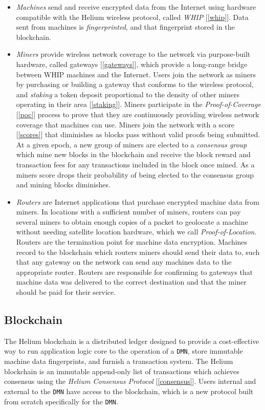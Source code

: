 \documentclass[10pt, nonatbib, nocopyrightspace, reprint]{sigplanconf}
\newcommand{\secref}[1]{[\autoref{#1}]}
\begin{document}
\begin{itemize}
    \item \emph{Machines} send and receive encrypted data from the Internet using hardware compatible with the Helium wireless protocol, called \emph{WHIP} \secref{whip}. Data sent from machines is \emph{fingerprinted}, and that fingerprint stored in the blockchain.
    \item \emph{Miners} provide wireless network coverage to the network via purpose-built hardware, called gateways \secref{gateways}, which provide a long-range bridge between WHIP machines and the Internet. Users join the network as miners by purchasing or building a gateway that conforms to the wireless protocol, and \emph{staking} a token deposit proportional to the density of other miners operating in their area \secref{staking}. Miners participate in the \emph{Proof-of-Coverage} \secref{poc} process to prove that they are continuously providing wireless network coverage that machines can use. Miners join the network with a score \secref{scores} that diminishes as blocks pass without valid proofs being submitted. At a given epoch, a new group of miners are elected to a \emph{consensus group} which mine new blocks in the blockchain and receive the block reward and transaction fees for any transactions included in the block once mined. As a miners score drops their probability of being elected to the consensus group and mining blocks diminishes.
    \item \emph{Routers} are Internet applications that purchase encrypted machine data from miners. In locations with a sufficient number of miners, routers can pay several miners to obtain enough copies of a packet to geolocate a machine without needing satellite location hardware, which we call \emph{Proof-of-Location}.  Routers are the termination point for machine data encryption. Machines record to the blockchain which routers miners should send their data to, such that any gateway on the network can send any machines data to the appropriate router. Routers are responsible for confirming to gateways that machine data was delivered to the correct destination and that the miner should be paid for their service.
\end{itemize}

\subsection{Blockchain} \label{blockchain}

The Helium blockchain is a distributed ledger designed to provide a cost-effective way to run application logic core to the operation of a \verb|DMN|, store immutable machine data fingerprints, and furnish a transaction system. The Helium blockchain is an immutable append-only list of transactions which achieves consensus using the \emph{Helium Consensus Protocol} \secref{consensus}. Users internal and external to the \verb|DMN| have access to the blockchain, which is a new protocol built from scratch specifically for the \verb|DMN|.
\end{document}
